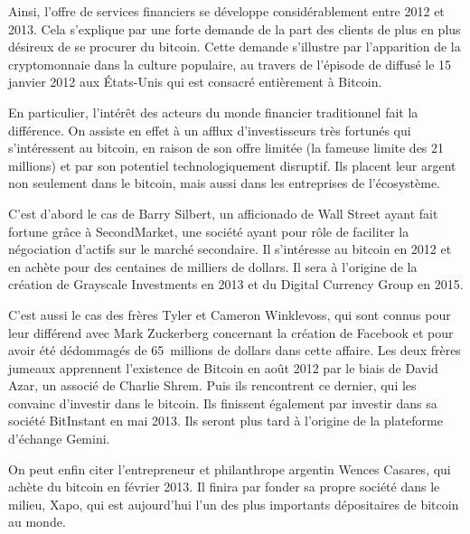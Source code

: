 Ainsi, l'offre de services financiers se développe considérablement entre 2012 et 2013. Cela s'explique par une forte demande de la part des clients de plus en plus désireux de se procurer du bitcoin. Cette demande s'illustre par l'apparition de la cryptomonnaie dans la culture populaire, au travers de l'épisode de  diffusé le 15 janvier 2012 aux États-Unis qui est consacré entièrement à Bitcoin.


En particulier, l'intérêt des acteurs du monde financier traditionnel fait la différence. On assiste en effet à un afflux d'investisseurs très fortunés qui s'intéressent au bitcoin, en raison de son offre limitée (la fameuse limite des 21 millions) et par son potentiel technologiquement disruptif. Ils placent leur argent non seulement dans le bitcoin, mais aussi dans les entreprises de l'écosystème.

C'est d'abord le cas de Barry Silbert, un afficionado de Wall Street ayant fait fortune grâce à SecondMarket, une société ayant pour rôle de faciliter la négociation d'actifs sur le marché secondaire. Il s'intéresse au bitcoin en 2012 et en achète pour des centaines de milliers de dollars. Il sera à l'origine de la création de Grayscale Investments en 2013 et du Digital Currency Group en 2015.

C'est aussi le cas des frères Tyler et Cameron Winklevoss, qui sont connus pour leur différend avec Mark Zuckerberg concernant la création de Facebook et pour avoir été dédommagés de 65~millions de dollars dans cette affaire. Les deux frères jumeaux apprennent l'existence de Bitcoin en août 2012 par le biais de David Azar, un associé de Charlie Shrem. Puis ils rencontrent ce dernier, qui les convainc d'investir dans le bitcoin. Ils finissent également par investir dans sa société BitInstant en mai 2013. Ils seront plus tard à l'origine de la plateforme d'échange Gemini.

On peut enfin citer l'entrepreneur et philanthrope argentin Wences Casares, qui achète du bitcoin en février 2013. Il finira par fonder sa propre société dans le milieu, Xapo, qui est aujourd'hui l'un des plus importants dépositaires de bitcoin au monde.

